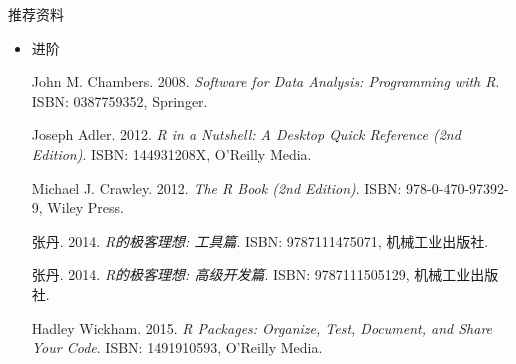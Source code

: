 \begin{frame}[t]{推荐资料}{}
\begin{itemize}
\item 进阶
\begin{thebibliography}{10} \footnotesize

{\beamertemplatebookbibitems
John M. Chambers. 2008. \emph{Software for Data Analysis: Programming with R}. ISBN: 0387759352, Springer.}

{\beamertemplatebookbibitems
Joseph Adler. 2012. \emph{R in a Nutshell: A Desktop Quick Reference (2nd Edition)}. ISBN: 144931208X, O'Reilly Media.}

{\beamertemplatebookbibitems
Michael J. Crawley. 2012. \emph{The R Book (2nd Edition)}. ISBN: 978-0-470-97392-9, Wiley Press.}

{\beamertemplatebookbibitems
张丹. 2014. \emph{R的极客理想: 工具篇}. ISBN: 9787111475071, 机械工业出版社.}

{\beamertemplatebookbibitems
张丹. 2014. \emph{R的极客理想: 高级开发篇}. ISBN: 9787111505129, 机械工业出版社.}

{\beamertemplatebookbibitems
Hadley Wickham. 2015. \emph{R Packages: Organize, Test, Document, and Share Your Code}. ISBN: 1491910593, O'Reilly Media.}

\end{thebibliography}

\end{itemize}
\end{frame}

